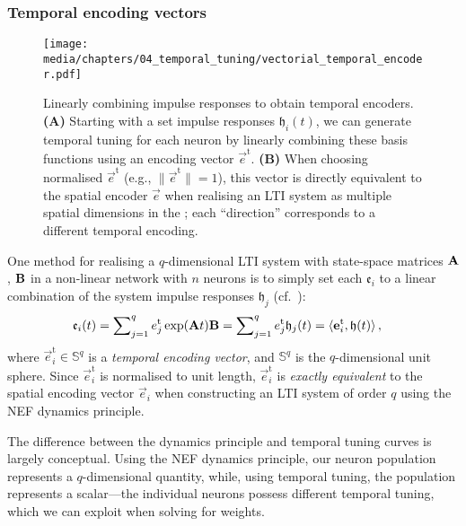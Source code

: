 \subsubsection{Temporal encoding vectors}

\begin{figure}
	\texttt{[image: media/chapters/04\_temporal\_tuning/vectorial\_temporal\_encoder.pdf]}
	\caption[Linearly combining impulse responses to obtain temporal encoders]{Linearly combining impulse responses to obtain temporal encoders. \textbf{(A)} Starting with a set impulse responses $\mathfrak{h}_i(t)$, we can generate temporal tuning for each neuron by linearly combining these basis functions using an encoding vector $\vec{e}^\mathrm{t}$.
	\textbf{(B)} When choosing normalised $\vec{e}^\mathrm{t}$ (e.g., $\| \vec{e}^\mathrm{t} \| = 1$), this vector is directly equivalent to the spatial encoder $\vec e$ when realising an LTI system as multiple spatial dimensions in the \NEF; each \enquote{direction} corresponds to a different temporal encoding.
	}
	\label{fig:vectorial_temporal_encoder}
\end{figure}

One method for realising a $q$-dimensional LTI system with state-space matrices $\mathbf{A}$, $\mathbf{B}$ in a non-linear network with $n$ neurons is to simply set each $\mathfrak{e}_i$ to a linear combination of the system impulse responses $\mathfrak{h}_j$ (cf.~):
\begin{align}
	\mathfrak{e}_i(t) &= \sum\nolimits_{j = 1}^q {e}^\mathrm{t}_j \exp(\mathbf{A} t) \mathbf{B} = \sum\nolimits_{j = 1}^q {e}^\mathrm{t}_j \mathfrak{h}_j(t)  = \langle \mathbf{e}_i^\mathrm{t}, \mathbf{\mathfrak{h}}(t) \rangle \,,
	\label{eqn:temporal_encoding_vector}
\end{align}
where $\vec{e}_i^\mathrm{t} \in \mathbb{S}^q$ is a \emph{temporal encoding vector}, and $\mathbb{S}^q$ is the $q$-dimensional unit sphere.
Since $\vec{e}_i^\mathrm{t}$ is normalised to unit length, $\vec{e}_i^\mathrm{t}$ is \emph{exactly equivalent} to the spatial encoding vector $\vec e_i$ when constructing an LTI system of order $q$ using the NEF dynamics principle.

The difference between the dynamics principle and temporal tuning curves is largely conceptual.
Using the NEF dynamics principle, our neuron population represents a $q$-dimensional quantity, while, using temporal tuning, the population represents a scalar---the individual neurons possess different temporal tuning, which we can exploit when solving for weights.

